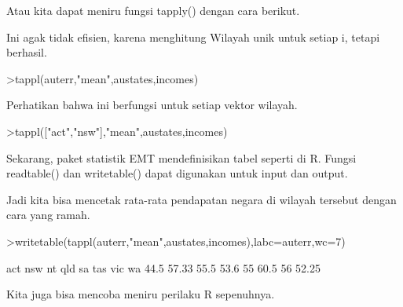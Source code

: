 \documentclass[a4paper,10pt]{article}
\begin{document}
\begin{eulernotebook}
\begin{eulercomment}
\begin{eulercomment}
\begin{eulercomment}
\begin{eulercomment}
\begin{eulercomment}
Atau kita dapat meniru fungsi tapply() dengan cara berikut.
\end{eulercomment}
\begin{eulercomment}
Ini agak tidak efisien, karena menghitung Wilayah unik untuk setiap i,
tetapi berhasil.
\end{eulercomment}
\begin{eulerprompt}
>tappl(auterr,"mean",austates,incomes)
\end{eulerprompt}
\begin{euleroutput}
  [44.5,  57.3333333333,  55.5,  53.6,  55,  60.5,  56,  52.25]
\end{euleroutput}
\begin{eulercomment}
Perhatikan bahwa ini berfungsi untuk setiap vektor wilayah.
\end{eulercomment}
\begin{eulerprompt}
>tappl(["act","nsw"],"mean",austates,incomes)
\end{eulerprompt}
\begin{euleroutput}
  [44.5,  57.3333333333]
\end{euleroutput}
\begin{eulercomment}
Sekarang, paket statistik EMT mendefinisikan tabel seperti di R.
Fungsi readtable() dan writetable() dapat digunakan untuk input dan
output.

Jadi kita bisa mencetak rata-rata pendapatan negara di wilayah
tersebut dengan cara yang ramah.
\end{eulercomment}
\begin{eulerprompt}
>writetable(tappl(auterr,"mean",austates,incomes),labc=auterr,wc=7)
\end{eulerprompt}
\begin{euleroutput}
      act    nsw     nt    qld     sa    tas    vic     wa
     44.5  57.33   55.5   53.6     55   60.5     56  52.25
\end{euleroutput}
\begin{eulercomment}
Kita juga bisa mencoba meniru perilaku R sepenuhnya.


\end{eulercomment}
\end{eulercomment}
\end{eulercomment}
\end{eulercomment}
\end{eulercomment}
\end{eulernotebook}
\end{document}
